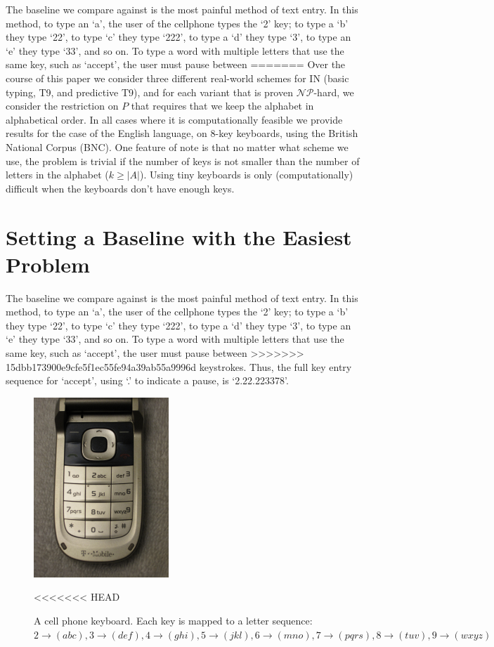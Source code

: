 \documentclass[runningheads]{llncs}
\newcommand{\NP}{\ensuremath{\mathcal{NP}}}
\begin{document}
\begin{prob}[{\sc
MinimumKeystrokes}]
The baseline we compare against is the most painful method of text entry.  In
this method, to type an `a', the user of the cellphone types the `2' key; to
type a `b' they type `22', to type `c' they type `222', to type a `d' they type
`3', to type an `e' they type `33', and so on.  To type a word with multiple
letters that use the same key, such as `accept', the user must pause between
=======
Over the course of this paper we consider three different real-world schemes
for $\mathrm{IN}$ (basic typing, T9, and predictive T9), and for each variant
that is proven \NP-hard, we consider the restriction on $P$ that requires that
we keep the alphabet in alphabetical order.  In all cases where it is
computationally feasible we provide results for the case of the English
language, on 8-key keyboards, using the British National Corpus\cite{bnc}
(BNC).  One feature of note is that no matter what scheme we use, the problem
is trivial if the number of keys is not smaller than the number of letters in
the alphabet ($k \ge |A|$).  Using tiny keyboards is only (computationally)
difficult when the keyboards don't have enough keys.

\section{Setting a Baseline with the Easiest Problem}

The baseline we compare against is the most painful method of text entry.  In this
method, to type an `a', the user of the cellphone types the `2' key; to type a
`b' they type `22', to type `c' they type `222', to type a `d' they type `3',
to type an `e' they type `33', and so on.  To type a word with multiple letters
that use the same key, such as `accept', the user must pause between
>>>>>>> 15dbb173900e9cfe5f1ec55fe94a39ab55a9996d
keystrokes.  Thus, the full key entry sequence for `accept', using `.' to
indicate a pause, is `2.22.223378'.

\begin{figure}[t]
\begin{center}
\includegraphics[width=2in]{phonekeys.jpg}
\end{center}
<<<<<<< HEAD
\caption{A cell phone keyboard. Each key is mapped to a letter sequence: $2 \to (abc), 3\to (def), 4\to (ghi), 5\to (jkl), 6 \to (mno), 7 \to (pqrs), 8\to (tuv), 9\to (wxyz) $}
\label{keypic}
\end{figure}


\end{prob}
\end{document}
